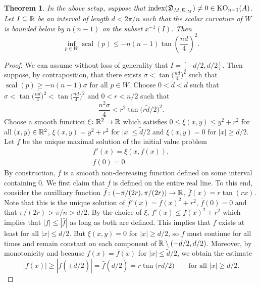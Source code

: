 \documentclass[11pt]{article}
\DeclareMathOperator{\scal}{scal}
\DeclareMathOperator{\KO}{KO}
\DeclareMathOperator{\ind}{index}
\numberwithin{equation}{section}
\newtheorem{Theorem}{Theorem}[section]
\begin{document}
\begin{Theorem}\label{thm:quantitative-codim-1}
 In the above setup, suppose that \(\ind(\Dirac_{M, E|_M}) \neq 0 \in \KO_{n-1}(A)\).
 Let \(I \subseteq \mathbb{R}\) be an interval of length \(d < 2 \pi / n\) such that the scalar curvature of \(W\) is bounded below by \(n(n-1)\) on the subset \(x^{-1}(I)\).
 Then
 \begin{equation*}
 \inf_{p \in W} \scal(p) \leq - n(n-1) \tan\left(\frac{nd}{4}\right)^2.
 \end{equation*}
 \end{Theorem}
 \begin{proof}
 We can assume without loss of generality that \(I = [-d/2,d/2]\).
 Then suppose, by contraposition, that there exists \(\sigma < \tan\big(\frac{nd}{4}\big)^2\) such that \(\scal(p) \geq -n(n-1) \sigma\) for all \(p \in W\).
 Choose \(0 < \tilde{d} < d\) such that \(\sigma < \tan\big(\frac{n\tilde{d}}{4}\big)^2 < \tan\big(\frac{nd}{4}\big)^2\) and \(0 < r < n/2\) such that
 \begin{equation}
 \frac{n^2 \sigma}{4} < r^2 \tan\big(r\tilde{d}/2\big)^2. \label{eq:choose-r}
 \end{equation}
 Choose a smooth function \(\xi \colon \mathbb{R}^2 \to \mathbb{R}\) which satisfies \(0 \leq \xi(x,y) \leq y^2 + r^2\) for all \((x,y) \in \mathbb{R}^2\), \(\xi(x,y) = y^2 + r^2\) for \(|x| \leq \tilde{d}/2\) and \(\xi(x,y) = 0\) for \(|x| \geq d/2\).
 Let \(f\) be the unique maximal solution of the initial value problem
 \begin{gather*}
 f'(x) = \xi(x,f(x)), \\
 f(0) = 0.
 \end{gather*}
 By construction, \(f\) is a smooth non-decreasing function defined on some interval containing \(0\).
 We first claim that \(f\) is defined on the entire real line.
 To this end, consider the auxilliary function \(\bar{f} \colon (-\pi/(2 r), \pi/(2r)) \to \mathbb{R}\), \(\bar{f}(x) = r \tan(r x)\).
 Note that this is the unique solution of \(\bar{f}'(x)= \bar{f}(x)^2 + r^2\), \(\bar{f}(0) = 0\) and that \(\pi/(2r) > \pi /n > d/2\).
 By the choice of \(\xi\), \(f'(x) \leq f(x)^2 + r^2\) which implies that \(|f| \leq |\bar{f}|\) as long as both are defined.
 This implies that \(f\) exists at least for all \(|x| \leq d/2\).
 But \(\xi(x,y) = 0\) for \(|x| \geq d/2\), so \(f\) must continue for all times and remain constant on each component of \(\mathbb{R} \setminus (-d/2,d/2)\).
 Moreover, by monotonicity and because \(f(x) = \bar{f}(x)\) for \(|x| \leq \tilde{d}/2\), we obtain the estimate
 \begin{equation}
 |f(x)| \geq |f(\pm \tilde{d}/2)| = \bar{f}(\tilde{d}/2) = r \tan\big(r \tilde{d} / 2\big) \qquad \text{for all \(|x| \geq d/2\).}
 \label{eq:outside-bound}
 \end{equation}


\end{proof}
\end{document}
